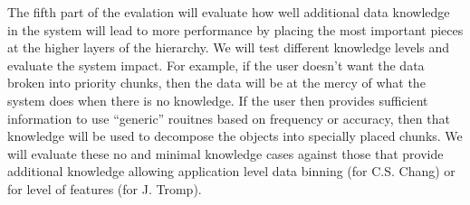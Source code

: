 The fifth part of the evalation will evaluate how well additional data
knowledge in the system will lead to more performance by placing the most
important pieces at the higher layers of the hierarchy. We will test different
knowledge levels and evaluate the system impact.  For example, if the user
doesn't want the data broken into priority chunks, then the data will be at
the mercy of what the system does when there is no knowledge. If the user then 
provides sufficient information to use ``generic'' rouitnes based on frequency
or accuracy, then that knowledge will be used to decompose the objects into
specially placed chunks. We will evaluate these no and minimal knowledge cases
against those that provide additional knowledge allowing application level data
binning (for C.S. Chang) or for level of features (for J. Tromp).




